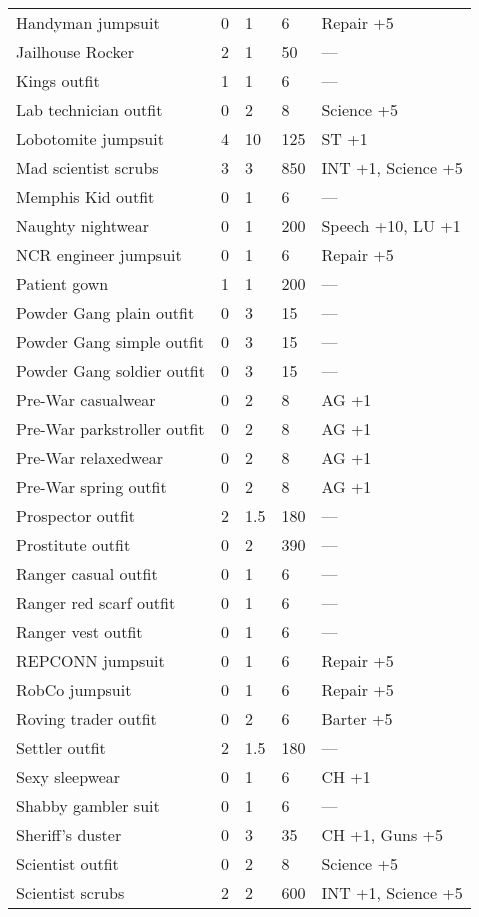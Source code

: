 \begin{longtable}{|p{6cm}|p{0.9cm}|p{1.2cm}|p{1.2cm}|p{6cm}|}
Handyman jumpsuit & 0 & 1 & 6 & Repair +5 \\
Jailhouse Rocker & 2 & 1 & 50 & — \\
Kings outfit & 1 & 1 & 6 & — \\
Lab technician outfit & 0 & 2 & 8 & Science +5 \\
Lobotomite jumpsuit & 4 & 10 & 125 & ST +1 \\
Mad scientist scrubs & 3 & 3 & 850 & INT +1, Science +5 \\
Memphis Kid outfit & 0 & 1 & 6 & — \\
Naughty nightwear & 0 & 1 & 200 & Speech +10, LU +1 \\
NCR engineer jumpsuit & 0 & 1 & 6 & Repair +5 \\
Patient gown & 1 & 1 & 200 & — \\
Powder Gang plain outfit & 0 & 3 & 15 & — \\
Powder Gang simple outfit & 0 & 3 & 15 & — \\
Powder Gang soldier outfit & 0 & 3 & 15 & — \\
Pre-War casualwear & 0 & 2 & 8 & AG +1 \\
Pre-War parkstroller outfit & 0 & 2 & 8 & AG +1 \\
Pre-War relaxedwear & 0 & 2 & 8 & AG +1 \\
Pre-War spring outfit & 0 & 2 & 8 & AG +1 \\
Prospector outfit & 2 & 1.5 & 180 & — \\
Prostitute outfit & 0 & 2 & 390 & — \\
Ranger casual outfit & 0 & 1 & 6 & — \\
Ranger red scarf outfit & 0 & 1 & 6 & — \\
Ranger vest outfit & 0 & 1 & 6 & — \\
REPCONN jumpsuit & 0 & 1 & 6 & Repair +5 \\
RobCo jumpsuit & 0 & 1 & 6 & Repair +5 \\
Roving trader outfit & 0 & 2 & 6 & Barter +5 \\
Settler outfit & 2 & 1.5 & 180 & — \\
Sexy sleepwear & 0 & 1 & 6 & CH +1 \\
Shabby gambler suit & 0 & 1 & 6 & — \\
Sheriff's duster & 0 & 3 & 35 & CH +1, Guns +5 \\
Scientist outfit & 0 & 2 & 8 & Science +5 \\
Scientist scrubs & 2 & 2 & 600 & INT +1, Science +5 \\

\end{longtable}
